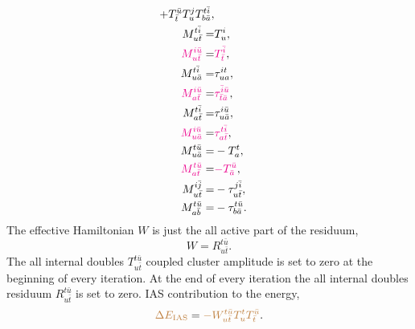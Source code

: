 \documentclass[a4paper,12pt,oneside]{book}
\newcommand{\magenta}[1]{{\color{magenta} #1}}
\newcommand{\brown}[1]{{\color{brown} #1}}
\newcommand{\spa}[1]{{#1}}
\newcommand{\spb}[1]{\bar{#1}}
\begin{document}
\begin{align}
{                                                      +T^{\spb{u}}_{\spb{t}} T^{\spa{j}}_{\spa{u}} T^{\spa{t}\spb{i}}_{\spa{b}\spb{a}}},\\
M^{\spa{t}\spb{i}}_{\spa{u}\spb{t}} = &T^{\spa{i}}_{\spa{u}},\\
\magenta{M^{\spa{i}\spb{u}}_{\spa{u}\spb{t}}} = &\magenta{T^{\spb{i}}_{\spb{t}}}, \\
M^{\spa{t}\spb{i}}_{\spa{u}\spb{a}} = &\tau^{\spa{i}\spa{t}}_{\spa{u}\spa{a}}, \\
\magenta{M^{\spa{i}\spb{u}}_{\spa{a}\spb{t}}} = &\magenta{\tau^{\spb{i}\spb{u}}_{\spb{t}\spb{a}}}, \\
M^{\spa{t}\spb{i}}_{\spa{a}\spb{t}} = &\tau^{\spa{i}\spb{u}}_{\spa{u}\spb{a}}, \\
\magenta{M^{\spa{i}\spb{u}}_{\spa{u}\spb{a}}} = &\magenta{\tau^{\spa{t}\spb{i}}_{\spa{a}\spb{t}}},\\
M^{\spa{t}\spb{u}}_{\spa{u}\spb{a}} = &-T^{\spa{t}}_{\spa{a}},\\
\magenta{M^{\spa{t}\spb{u}}_{\spa{a}\spb{t}}} = &\magenta{-T^{\spb{u}}_{\spb{a}}},\\
M^{\spa{i}\spb{j}}_{\spa{u}\spb{t}} = &-\tau^{\spa{j}\spb{i}}_{\spa{u}\spb{t}}, \\
M^{\spa{t}\spb{u}}_{\spa{a}\spb{b}} = &-\tau^{\spa{t}\spb{u}}_{\spa{b}\spb{a}}.
\end{align}
The effective Hamiltonian $W$ is just the all active part of the residuum,
\begin{equation}
W = R^{\spa{t}\spb{u}}_{\spa{u}\spb{t}}.
\end{equation}
The all internal doubles $T^{\spa{t}\spb{u}}_{\spa{u}\spb{t}}$ coupled cluster amplitude 
is set to zero at the beginning of every iteration.
At the end of every iteration the all internal doubles residuum $R^{\spa{t}\spb{u}}_{\spa{u}\spb{t}}$ is set to zero. \newline
IAS contribution to the energy,
\begin{equation}
\brown{\Delta E_{\mathrm{IAS}}} = \brown{-W^{\spa{t}\spb{u}}_{\spa{u}\spb{t}} T^{\spa{t}}_{\spa{u}} T^{\spb{u}}_{\spb{t}}}.
\end{equation}
\end{document}
